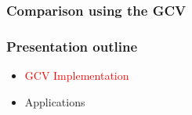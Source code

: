 \documentclass[11pt,xcolor=table]{beamer}
\newcommand{\hilight}[1]{\colorbox{yellow}{#1}}
\begin{document}
\begin{frame}
  \frametitle{Comparison using the GCV}
  \begin{minipage}{\textwidth}
  \begin{center}
  \noindent
  \hfill
  \end{center}
  \end{minipage}  
  
  
\end{frame}

\begin{frame}
 \frametitle{Presentation outline}
 
 \begin{itemize}
  \item \textcolor{red}{GCV Implementation} \vfill
  \item Applications \vfill
  
  \begin{figure}
    \hspace{-3em}
    \begin{tikzpicture}[scale=0.7,auto,swap]



\end{tikzpicture}
\end{figure}
\end{itemize}
\end{frame}
\end{document}
